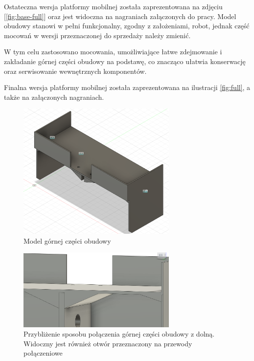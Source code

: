 \hspace{1cm}

Ostateczna wersja platformy mobilnej została zaprezentowana na zdjęciu [\ref{fig:base-full}] oraz jest widoczna na nagraniach załączonych do pracy. Model obudowy stanowi w pełni funkcjonalny, zgodny z założeniami, robot, jednak część mocowań w wersji przeznaczonej do sprzedaży należy zmienić. 

W tym celu zastosowano mocowania, umożliwiające łatwe zdejmowanie i zakładanie górnej części obudowy na podstawę, co znacząco ułatwia konserwację oraz serwisowanie wewnętrznych komponentów.

Finalna wersja platformy mobilnej została zaprezentowana na ilustracji \ref{fig:full}, a także na załączonych nagraniach.


\begin{figure}[H]
  \centering
  \includegraphics[width=0.7\textwidth]{./graf/upper.png}
  \caption{Model górnej części obudowy}
  \label{fig:ball-close}
\end{figure}

\begin{figure}[H]
  \centering
  \includegraphics[width=0.7\textwidth]{./graf/full-close.png}
  \caption{Przybliżenie sposobu połączenia górnej części obudowy z dolną. Widoczny jest również otwór przeznaczony na przewody połączeniowe}
  \label{fig:full-close}
\end{figure}


